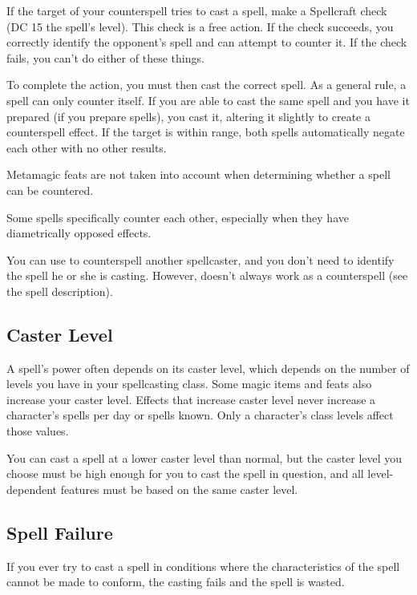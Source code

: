 If the target of your counterspell tries to cast a spell, make a Spellcraft check (DC 15 \add the spell's level). This check is a free action. If the check succeeds, you correctly identify the opponent's spell and can attempt to counter it. If the check fails, you can't do either of these things.

To complete the action, you must then cast the correct spell. As a general rule, a spell can only counter itself. If you are able to cast the same spell and you have it prepared (if you prepare spells), you cast it, altering it slightly to create a counterspell effect. If the target is within range, both spells automatically negate each other with no other results.

 Metamagic feats are not taken into account when determining whether a spell can be countered.

 Some spells specifically counter each other, especially when they have diametrically opposed effects.

 You can use  to counterspell another spellcaster, and you don't need to identify the spell he or she is casting. However,  doesn't always work as a counterspell (see the spell description).

\subsection{Caster Level}
A spell's power often depends on its caster level, which depends on the number of levels you have in your spellcasting class. Some magic items and feats also increase your caster level. Effects that increase caster level never increase a character's spells per day or spells known. Only a character's class levels affect those values.

You can cast a spell at a lower caster level than normal, but the caster level you choose must be high enough for you to cast the spell in question, and all level-dependent features must be based on the same caster level.

\subsection{Spell Failure}
If you ever try to cast a spell in conditions where the characteristics of the spell cannot be made to conform, the casting fails and the spell is wasted.

